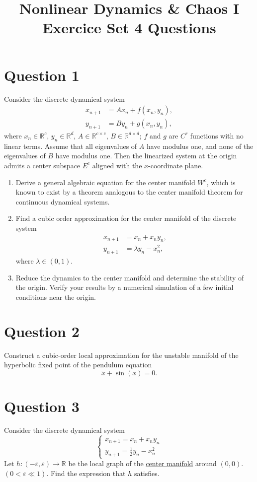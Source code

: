 \documentclass[twoside,10pt,a4paper]{article}
\title{\huge \textbf{Nonlinear Dynamics \& Chaos I \\ \Large Exercice Set 4 Questions}}	%
\author{ }		%
\date{ }	%
\begin{document}
\maketitle

\section*{Question 1}
Consider the discrete dynamical system
\begin{align*}
	x_{n+1} &= Ax_n + f(x_n, y_n), \\
	y_{n+1} &= By_n + g(x_n, y_n),
\end{align*}
where $x_n \in \mathbb{R}^c$, $y_n \in \mathbb{R}^d$, $A \in \mathbb{R}^{c \times c}$, $B \in \mathbb{R}^{d \times d}$; $f$ and $g$ are $C^r$ functions with no linear terms. Assume that all eigenvalues of $A$ have modulus one, and none of the eigenvalues of $B$ have modulus one. Then the linearized system at the origin admits a center subspace $E^c$ aligned with the $x$-coordinate plane.

\begin{enumerate}[label=(\alph*)]
	\item Derive a general algebraic equation for the center manifold $W^c$, which is known to exist by a theorem analogous to the center manifold theorem for continuous dynamical systems.
	\item Find a cubic order approximation for the center manifold of the discrete system
	\begin{align*}
		x_{n+1} &= x_n + x_ny_n, \\
		y_{n+1} &= \lambda y_n - x_n^2,
	\end{align*}
	where $\lambda \in (0,1).$
	\item Reduce the dynamics to the center manifold and determine the stability of the origin. Verify your results by a numerical simulation of a few initial conditions near the origin.
\end{enumerate}

\section*{Question 2}
Construct a cubic-order local approximation for the unstable manifold of the hyperbolic fixed point of the pendulum equation
\begin{equation*}
	\ddot{x} + \sin(x) = 0.
\end{equation*}

\section*{Question 3}
Consider the discrete dynamical system
\begin{equation*}
	\begin{cases}
		x_{n+1} = x_n + x_ny_n \\
		y_{n+1} = \frac{1}{2}y_n - x_n^2
	\end{cases}
\end{equation*}
Let $h:(-\varepsilon, \varepsilon) \longrightarrow \mathbb{R}$ be the local graph of the \underline{center manifold} around $(0,0)$. $(0 < \varepsilon \ll 1)$. Find the expression that $h$ satisfies.
\end{document}
